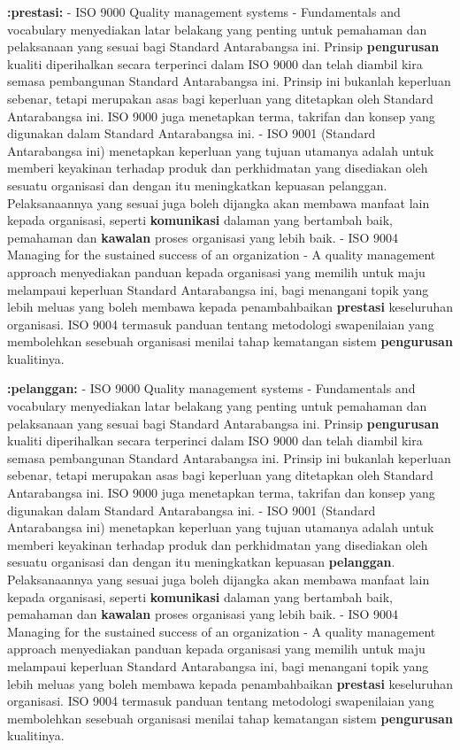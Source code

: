 \documentclass{article}
\begin{document}
\textbf{:prestasi:} - ISO 9000 Quality management systems - Fundamentals and vocabulary menyediakan
 latar belakang yang penting untuk pemahaman dan pelaksanaan yang sesuai bagi
 Standard Antarabangsa ini. Prinsip \textbf{pengurusan} kualiti diperihalkan secara terperinci
 dalam ISO 9000 dan telah diambil kira semasa pembangunan Standard Antarabangsa
 ini. Prinsip ini bukanlah keperluan sebenar, tetapi merupakan asas bagi keperluan yang
 ditetapkan oleh Standard Antarabangsa ini. ISO 9000 juga menetapkan terma, takrifan
 dan konsep yang digunakan dalam Standard Antarabangsa ini.
- ISO 9001 (Standard Antarabangsa ini) menetapkan keperluan yang tujuan utamanya
 adalah untuk memberi keyakinan terhadap produk dan perkhidmatan yang disediakan
 oleh sesuatu organisasi dan dengan itu meningkatkan kepuasan pelanggan.
 Pelaksanaannya yang sesuai juga boleh dijangka akan membawa manfaat lain kepada
 organisasi, seperti \textbf{komunikasi} dalaman yang bertambah baik, pemahaman dan \textbf{kawalan}
 proses organisasi yang lebih baik.
- ISO 9004 Managing for the sustained success of an organization - A quality
 management approach menyediakan panduan kepada organisasi yang memilih untuk
 maju melampaui keperluan Standard Antarabangsa ini, bagi menangani topik yang lebih
 meluas yang boleh membawa kepada penambahbaikan \textbf{prestasi} keseluruhan organisasi.
 ISO 9004 termasuk panduan tentang metodologi swapenilaian yang membolehkan
 sesebuah organisasi menilai tahap kematangan sistem \textbf{pengurusan} kualitinya.

\textbf{:pelanggan:} - ISO 9000 Quality management systems - Fundamentals and vocabulary menyediakan
 latar belakang yang penting untuk pemahaman dan pelaksanaan yang sesuai bagi
 Standard Antarabangsa ini. Prinsip \textbf{pengurusan} kualiti diperihalkan secara terperinci
 dalam ISO 9000 dan telah diambil kira semasa pembangunan Standard Antarabangsa
 ini. Prinsip ini bukanlah keperluan sebenar, tetapi merupakan asas bagi keperluan yang
 ditetapkan oleh Standard Antarabangsa ini. ISO 9000 juga menetapkan terma, takrifan
 dan konsep yang digunakan dalam Standard Antarabangsa ini.
- ISO 9001 (Standard Antarabangsa ini) menetapkan keperluan yang tujuan utamanya
 adalah untuk memberi keyakinan terhadap produk dan perkhidmatan yang disediakan
 oleh sesuatu organisasi dan dengan itu meningkatkan kepuasan \textbf{pelanggan}.
 Pelaksanaannya yang sesuai juga boleh dijangka akan membawa manfaat lain kepada
 organisasi, seperti \textbf{komunikasi} dalaman yang bertambah baik, pemahaman dan \textbf{kawalan}
 proses organisasi yang lebih baik.
- ISO 9004 Managing for the sustained success of an organization - A quality
 management approach menyediakan panduan kepada organisasi yang memilih untuk
 maju melampaui keperluan Standard Antarabangsa ini, bagi menangani topik yang lebih
 meluas yang boleh membawa kepada penambahbaikan \textbf{prestasi} keseluruhan organisasi.
 ISO 9004 termasuk panduan tentang metodologi swapenilaian yang membolehkan
 sesebuah organisasi menilai tahap kematangan sistem \textbf{pengurusan} kualitinya.
\end{document}
